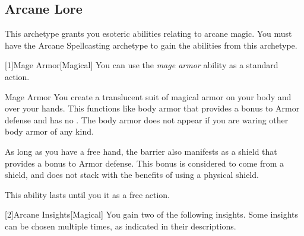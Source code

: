     \subsection{Arcane Lore}
        This archetype grants you esoteric abilities relating to arcane magic.
        You must have the Arcane Spellcasting archetype to gain the abilities from this archetype.

        [1]{Mage Armor}[Magical] You can use the \textit{mage armor} ability as a standard action.
        \begin{freeability}{Mage Armor}
            You create a translucent suit of magical armor on your body and over your hands.
            This functions like body armor that provides a  bonus to Armor defense and has no .
            The body armor does not appear if you are waring other body armor of any kind.

            As long as you have a free hand, the barrier also manifests as a shield that provides a  bonus to Armor defense.
            This bonus is considered to come from a shield, and does not stack with the benefits of using a physical shield.

            This ability lasts until you  it as a free action.
        \end{freeability}

        [2]{Arcane Insights}[Magical]
        You gain two of the following insights.
        Some insights can be chosen multiple times, as indicated in their descriptions.

